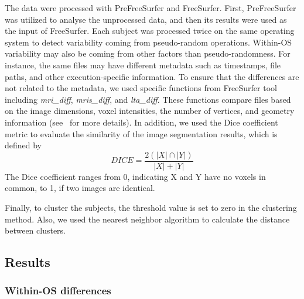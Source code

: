 \documentclass[a4paper,num-refs]{oup-contemporary}
\begin{document}
The data were processed with PreFreeSurfer and FreeSurfer. 
First, PreFreeSurfer was utilized to analyse the unprocessed data, and then its 
results were used as the input of FreeSurfer.
Each subject was processed twice on the same operating system to detect
variability coming from pseudo-random operations. 
Within-OS variability may also be coming from other factors than pseudo-randomness. 
For instance, the same files may have different metadata such as timestamps, 
file paths, and other execution-specific information. 
To ensure that the differences are not related to the metadata, 
we used specific functions from FreeSurfer tool including 
\emph{mri\_diff}, \emph{mris\_diff}, and \emph{lta\_diff}.
These functions compare files based on the image dimensions, 
voxel intensities, the number of vertices, and geometry information
(see~\cite{fischl2012freesurfer} for more details). 
In addition, we used the Dice coefficient metric to evaluate the similarity of 
the image segmentation results, which is defined by
\[DICE=\frac{2(|X|\cap|Y|)}{|X|+|Y|}\]
The Dice coefficient ranges from 0, indicating X and Y have no voxels in common, to 1, if 
two images are identical. 

Finally, to cluster the subjects, the threshold value is set to zero in the clustering method. 
Also, we used the nearest neighbor algorithm to calculate the distance between clusters.


\subsection{Results}




\subsubsection{Within-OS differences}
\end{document}
